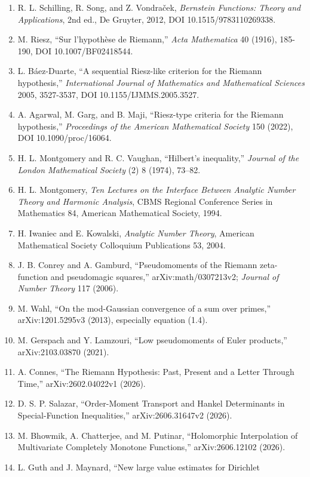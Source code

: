 \documentclass[
  11pt,
]{book}
\begin{document}
\begin{enumerate}
\item
  R. L. Schilling, R. Song, and Z. Vondraček, \emph{Bernstein Functions:
  Theory and Applications}, 2nd ed., De Gruyter, 2012, DOI
  10.1515/9783110269338.
\item
  M. Riesz, ``Sur l'hypothèse de Riemann,'' \emph{Acta Mathematica} 40
  (1916), 185-190, DOI 10.1007/BF02418544.
\item
  L. Báez-Duarte, ``A sequential Riesz-like criterion for the Riemann
  hypothesis,'' \emph{International Journal of Mathematics and
  Mathematical Sciences} 2005, 3527-3537, DOI 10.1155/IJMMS.2005.3527.
\item
  A. Agarwal, M. Garg, and B. Maji, ``Riesz-type criteria for the
  Riemann hypothesis,'' \emph{Proceedings of the American Mathematical
  Society} 150 (2022), DOI 10.1090/proc/16064.
\item
  H. L. Montgomery and R. C. Vaughan, ``Hilbert's inequality,''
  \emph{Journal of the London Mathematical Society} (2) 8 (1974),
  73--82.
\item
  H. L. Montgomery, \emph{Ten Lectures on the Interface Between Analytic
  Number Theory and Harmonic Analysis}, CBMS Regional Conference Series
  in Mathematics 84, American Mathematical Society, 1994.
\item
  H. Iwaniec and E. Kowalski, \emph{Analytic Number Theory}, American
  Mathematical Society Colloquium Publications 53, 2004.
\item
  J. B. Conrey and A. Gamburd, ``Pseudomoments of the Riemann
  zeta-function and pseudomagic squares,'' arXiv:math/0307213v2;
  \emph{Journal of Number Theory} 117 (2006).
\item
  M. Wahl, ``On the mod-Gaussian convergence of a sum over primes,''
  arXiv:1201.5295v3 (2013), especially equation (1.4).
\item
  M. Gerspach and Y. Lamzouri, ``Low pseudomoments of Euler products,''
  arXiv:2103.03870 (2021).
\item
  A. Connes, ``The Riemann Hypothesis: Past, Present and a Letter
  Through Time,'' arXiv:2602.04022v1 (2026).
\item
  D. S. P. Salazar, ``Order-Moment Transport and Hankel Determinants in
  Special-Function Inequalities,'' arXiv:2606.31647v2 (2026).
\item
  M. Bhowmik, A. Chatterjee, and M. Putinar, ``Holomorphic Interpolation
  of Multivariate Completely Monotone Functions,'' arXiv:2606.12102
  (2026).
\item
  L. Guth and J. Maynard, ``New large value estimates for Dirichlet

\end{enumerate}
\end{document}
